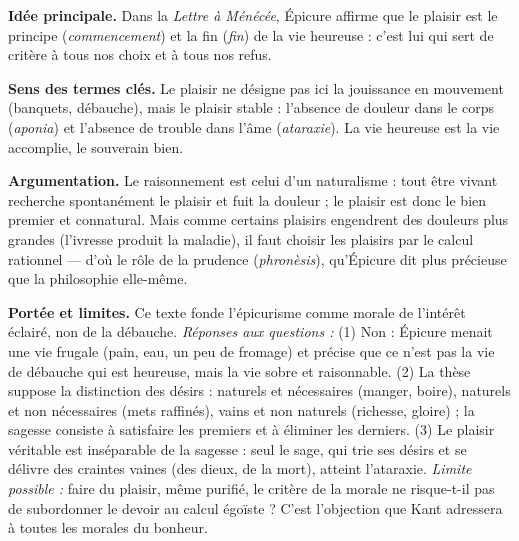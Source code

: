 \documentclass[11pt]{article}
\newcommand{\cle}[1]{{\popxbold\color{popdark}#1}}
\begin{document}
\begin{corrige}

\textbf{Idée principale.} Dans la \emph{Lettre à Ménécée}, Épicure affirme que le plaisir est le principe (\emph{commencement}) et la fin (\emph{fin}) de la vie heureuse : c'est lui qui sert de critère à tous nos choix et à tous nos refus.

\textbf{Sens des termes clés.} Le \cle{plaisir} ne désigne pas ici la jouissance en mouvement (banquets, débauche), mais le plaisir stable : l'absence de douleur dans le corps (\emph{aponia}) et l'absence de trouble dans l'âme (\emph{ataraxie}). La \cle{vie heureuse} est la vie accomplie, le souverain bien.

\textbf{Argumentation.} Le raisonnement est celui d'un naturalisme : tout être vivant recherche spontanément le plaisir et fuit la douleur ; le plaisir est donc le bien premier et connatural. Mais comme certains plaisirs engendrent des douleurs plus grandes (l'ivresse produit la maladie), il faut choisir les plaisirs par le calcul rationnel — d'où le rôle de la prudence (\emph{phronèsis}), qu'Épicure dit plus précieuse que la philosophie elle-même.

\textbf{Portée et limites.} Ce texte fonde l'épicurisme comme morale de l'intérêt éclairé, non de la débauche. \emph{Réponses aux questions :} (1) Non : Épicure menait une vie frugale (pain, eau, un peu de fromage) et précise que ce n'est pas la vie de débauche qui est heureuse, mais la vie sobre et raisonnable. (2) La thèse suppose la distinction des désirs : naturels et nécessaires (manger, boire), naturels et non nécessaires (mets raffinés), vains et non naturels (richesse, gloire) ; la sagesse consiste à satisfaire les premiers et à éliminer les derniers. (3) Le plaisir véritable est inséparable de la sagesse : seul le sage, qui trie ses désirs et se délivre des craintes vaines (des dieux, de la mort), atteint l'ataraxie. \emph{Limite possible :} faire du plaisir, même purifié, le critère de la morale ne risque-t-il pas de subordonner le devoir au calcul égoïste ? C'est l'objection que Kant adressera à toutes les morales du bonheur.
\end{corrige}
\end{document}
